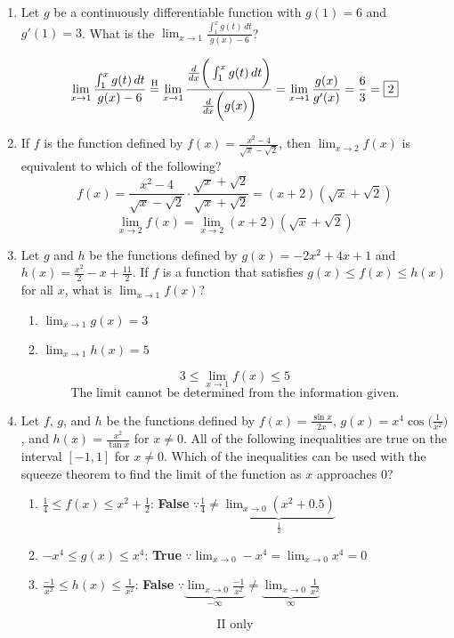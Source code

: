 \documentclass[12pt]{article}
\begin{document}
\begin{enumerate}
    \item Let $g$ be a continuously differentiable function with $g(1)=6$ and $g'(1)=3$. What is the $\lim_{x\to1}\frac{\int_{1}^{x} g(t) \,dt}{g(x)-6}$?
    
    $$\lim_{x\to1}\frac{\int_{1}^{x} g(t) \,dt}{g(x)-6} \overset{\mathrm{H}}{=} \lim_{x\to1}\frac{\frac{d}{dx}\biggr(\int_{1}^{x} g(t) \,dt\biggr)}{\frac{d}{dx}\biggr(g(x)\biggr)}=\lim_{x\to1}\frac{g(x)}{g'(x)}= \frac{6}{3}=\boxed{2}$$
    
    \item If $f$ is the function defined by $f(x)=\frac{x^2-4}{\sqrt{x}-\sqrt{2}}$, then $\lim_{x\to2}f(x)$ is equivalent to which of the following?
    $$f(x)=\frac{x^2-4}{\sqrt{x}-\sqrt{2}} \cdot \frac{\sqrt{x}+\sqrt{2}}{\sqrt{x}+\sqrt{2}} = (x+2)(\sqrt{x}+\sqrt{2})$$
    $$\boxed{\lim_{x\to2}f(x)= \lim_{x\to2} (x+2)(\sqrt{x}+\sqrt{2}) }$$
    \item Let $g$ and $h$ be the functions defined by $g(x)=-2x^2+4x+1$ and $h(x)=\frac{x^2}{2}-x+\frac{11}{2}$. If $f$ is a function that satisfies $g(x)\leq f(x)\leq h(x)$ for all $x$, what is $\lim_{x\to1}f(x)$?
\begin{enumerate}
    \item $\lim_{x\to1}g(x)=3$
    \item $\lim_{x\to1}h(x)=5$
\end{enumerate}
$$3 \leq \lim_{x\to1}f(x) \leq 5$$
$$\boxed{\text{The limit cannot be determined from the information given.}}$$
    
    \item Let $f$, $g$, and $h$ be the functions defined by $f(x)=\frac{\sin x}{2x}$, $g(x)=x^4\cos\bigg(\frac{1}{x^2}\bigg)$, and $h(x)=\frac{x^2}{\tan x}$ for $x\neq0$. All of the following inequalities are true on the interval $[-1,1]$ for $x\neq0$. Which of the inequalities can be used with the squeeze theorem to find the limit of the function as $x$ approaches 0?
    \begin{enumerate}[label=\Roman*.]
        \item $\frac{1}{4} \leq f(x) \leq x^2+\frac{1}{2}$: \textbf{False} $\because \frac{1}{4} \neq \underbrace{\lim_{x\to 0} (x^2+0.5)}_ {\frac{1}{2}}$
        \item $-x^4\leq g(x)\leq x^4$: \textbf{True} $\because \lim_{x\to 0} -x^4=\lim_{x\to 0} x^4=0$
        \item $\frac{-1}{x^2}\leq h(x) \leq \frac{1}{x^2}$: \textbf{False} $\because \underbrace{\lim_{x\to 0} \frac{-1}{x^2}}_{-\infty}  \neq \underbrace{\lim_{x\to 0} \frac{1}{x^2}}_{\infty}$
    \end{enumerate}
    $$\boxed{\text{II only}}$$
\end{enumerate}
\end{document}
